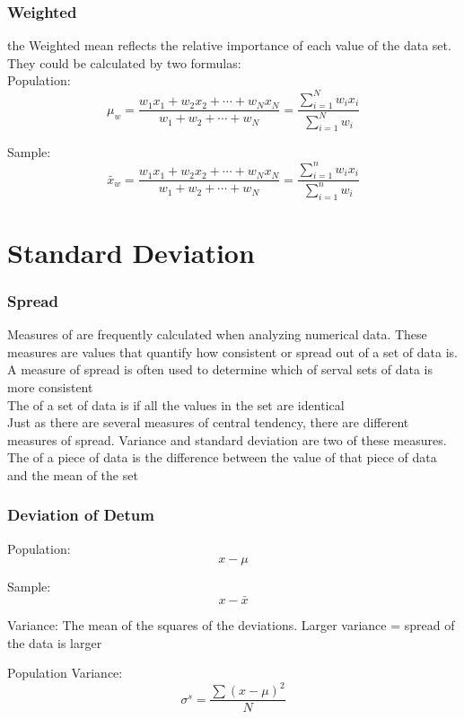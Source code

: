 \subsubsection{Weighted}
the Weighted mean reflects the relative importance of each value of the data set. They could be calculated by two formulas:\\

Population:
\[
    \mu_w = \frac{w_1x_1 + w_2x_2 + \cdots + w_Nx_N}{w_1 + w_2 + \cdots + w_N} = \frac{\sum_{i = 1}^{N} w_ix_i}{\sum_{i = 1}^{N}w_i}
\]

Sample:
\[
    \bar{x}_w = \frac{w_1x_1 + w_2x_2 + \cdots + w_Nx_N}{w_1 + w_2 + \cdots + w_N} = \frac{\sum_{i = 1}^{n} w_ix_i}{\sum_{i = 1}^{n}w_i}
\]

\section{Standard Deviation}
\subsubsection{Spread}
Measures of  are frequently calculated when analyzing numerical data. These measures are values that quantify how 
consistent or spread out of a set of data is. A measure of spread is often used to determine which of serval sets of data is 
more consistent\\

The  of a set of data is  if all the values in the set are identical\\

Just as there are several measures of central tendency, there are  different measures of spread. Variance and 
standard deviation are two of these measures.\\

The  of a piece of data is the difference between the value of that piece of data and the mean of the set

\subsubsection{Deviation of Detum}
Population:
\[
    x - \mu
\]

Sample:
\[
    x - \bar{x}
\]

\begin{definition}
    Variance: The mean of the squares of the deviations. Larger variance = spread of the data is larger
\end{definition}
Population Variance:
\[
    \sigma^s = \frac{\sum (x - \mu)^2}{N}
\]

